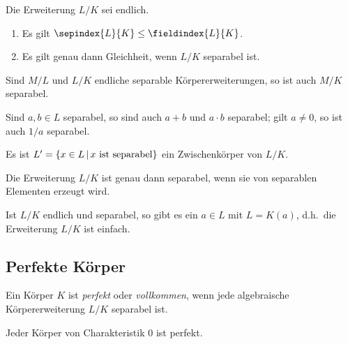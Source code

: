 \begin{corollary}
  Die Erweiterung $L/K$ sei endlich.
  \begin{enumerate}
    \item
      Es gilt $\sepindex{L}{K} \leq \fieldindex{L}{K}$.
    \item
      Es gilt genau dann Gleichheit, wenn $L/K$ separabel ist.
  \end{enumerate}
\end{corollary}

\begin{corollary}
  Sind $M/L$ und $L/K$ endliche separable Körpererweiterungen, so ist auch $M/K$ separabel.
\end{corollary}

\begin{corollary}
  Sind $a, b \in L$ separabel, so sind auch $a + b$ und $a \cdot b$ separabel;
  gilt $a \neq 0$, so ist auch $1/a$ separabel.
\end{corollary}

\begin{corollary}
  Es ist $L' = \{x \in L \suchthat \text{$x$ ist separabel}\}$ ein Zwischenkörper von $L/K$.
\end{corollary}

\begin{corollary}
  Die Erweiterung $L/K$ ist genau dann separabel, wenn sie von separablen Elementen erzeugt wird.
\end{corollary}

\begin{theorem}
  Ist $L/K$ endlich und separabel, so gibt es ein $a \in L$ mit $L = K(a)$, d.h.\ die Erweiterung $L/K$ ist einfach.
\end{theorem}



\subsection{Perfekte Körper}

\begin{definition}
  Ein Körper $K$ ist \emph{perfekt} oder \emph{vollkommen}, wenn jede algebraische Körpererweiterung $L/K$ separabel ist.
\end{definition}

\begin{example}
  Jeder Körper von Charakteristik $0$ ist perfekt.
\end{example}

